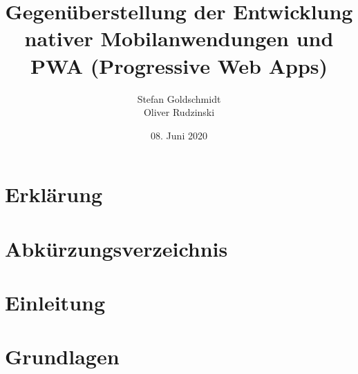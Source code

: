 


\title{Gegenüberstellung der Entwicklung nativer Mobilanwendungen und PWA (Progressive Web Apps)} 
\author{Stefan Goldschmidt\\Oliver Rudzinski}
\date{08. Juni 2020}



\makeatletter


    \clearpage 
	
	\thispagestyle{empty}
	
	\clearpage
	\chapter*{Erklärung}
	
	\thispagestyle{empty}
	
	\clearpage
	
	\thispagestyle{empty}
	
	\tableofcontents
	
	\chapter*{Abkürzungsverzeichnis}
	
	
	\listoffigures
	
	\listoftables
	
	\renewcommand\listoflistingscaption{List of source codes}
	\listoflistings


    \chapter{Einleitung} 
    \label{chap:einleitung}
    
    
    \chapter{Grundlagen} 
    \label{chap:grundlagen}
    
    
